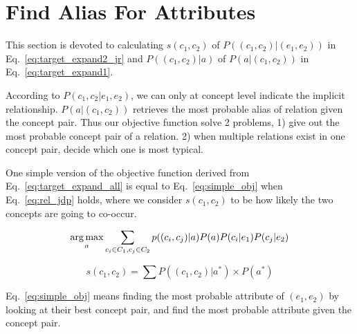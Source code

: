 \section{Find Alias For Attributes}
\label{sec:fafa}





This section is devoted to calculating $s(c_1,c_2)$ of $P((c_{1},c_{2})|(e_{1},e_{2}))$ in Eq.~\ref{eq:target_expand2_jr} and $P((c_{1},c_{2})|a)$ of $P(a|(c_{1},c_{2}))$ in Eq.~\ref{eq:target_expand1}.

According to $P(c_1,c_2|e_1,e_2)$, we can only at concept level indicate the implicit relationship. $P(a|(c_{1},c_{2}))$ retrieves the most probable alias of relation given the concept pair. Thus our objective function solve 2 problems, 1) give out the most probable concept pair of a relation. 2) when multiple relations exist in one concept pair, decide which one is most typical.




One simple version of the objective function derived from Eq.~\ref{eq:target_expand_all} is equal to Eq.~\ref{eq:simple_obj} when Eq.~\ref{eq:rel_jdp} holds, where we consider $s(c_1,c_2)$ to be how likely the two concepts are going to co-occur.

\begin{equation}
\label{eq:simple_obj}
 \operatorname*{arg\,max}_a \sum_{c_i\in C_1, c_j\in C_2} p((c_{i},c_{j})|a) P(a) P(c_i|e_1) P(c_j|e_2)
\end{equation}

\begin{equation}\label{eq:rel_jdp}
  s(c_1,c_2) = \sum{ P((c_{1},c_{2})|a^*) \times P(a^*)}
\end{equation}

Eq.~\ref{eq:simple_obj} means finding the most probable attribute of $(e_1,e_2)$ by looking at their best concept pair, and find the most probable attribute given the concept pair.



